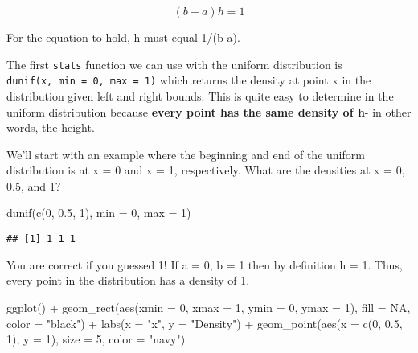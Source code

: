 \documentclass[
]{book}
\newenvironment{Shaded}{\begin{snugshade}}{\end{snugshade}}
\newcommand{\AttributeTok}[1]{\textcolor[rgb]{0.77,0.63,0.00}{#1}}
\newcommand{\ConstantTok}[1]{\textcolor[rgb]{0.00,0.00,0.00}{#1}}
\newcommand{\DecValTok}[1]{\textcolor[rgb]{0.00,0.00,0.81}{#1}}
\newcommand{\FloatTok}[1]{\textcolor[rgb]{0.00,0.00,0.81}{#1}}
\newcommand{\FunctionTok}[1]{\textcolor[rgb]{0.00,0.00,0.00}{#1}}
\newcommand{\NormalTok}[1]{#1}
\newcommand{\SpecialCharTok}[1]{\textcolor[rgb]{0.00,0.00,0.00}{#1}}
\newcommand{\StringTok}[1]{\textcolor[rgb]{0.31,0.60,0.02}{#1}}
\begin{document}
\[(b-a)h=1\]

For the equation to hold, h must equal 1/(b-a).

The first \texttt{stats} function we can use with the uniform distribution is \texttt{dunif(x,\ min\ =\ 0,\ max\ =\ 1)} which returns the density at point x in the distribution given left and right bounds. This is quite easy to determine in the uniform distribution because \textbf{every point has the same density of h}- in other words, the height.

We'll start with an example where the beginning and end of the uniform distribution is at x = 0 and x = 1, respectively. What are the densities at x = 0, 0.5, and 1?

\begin{Shaded}
\begin{Highlighting}[]
\FunctionTok{dunif}\NormalTok{(}\FunctionTok{c}\NormalTok{(}\DecValTok{0}\NormalTok{, }\FloatTok{0.5}\NormalTok{, }\DecValTok{1}\NormalTok{), }\AttributeTok{min =} \DecValTok{0}\NormalTok{, }\AttributeTok{max =} \DecValTok{1}\NormalTok{)}
\end{Highlighting}
\end{Shaded}

\begin{verbatim}
## [1] 1 1 1
\end{verbatim}

You are correct if you guessed 1! If a = 0, b = 1 then by definition h = 1. Thus, every point in the distribution has a density of 1.

\begin{Shaded}
\begin{Highlighting}[]
\FunctionTok{ggplot}\NormalTok{() }\SpecialCharTok{+}
  \FunctionTok{geom\_rect}\NormalTok{(}\FunctionTok{aes}\NormalTok{(}\AttributeTok{xmin =} \DecValTok{0}\NormalTok{, }\AttributeTok{xmax =} \DecValTok{1}\NormalTok{, }\AttributeTok{ymin =} \DecValTok{0}\NormalTok{, }\AttributeTok{ymax =} \DecValTok{1}\NormalTok{), }\AttributeTok{fill =} \ConstantTok{NA}\NormalTok{, }\AttributeTok{color =} \StringTok{"black"}\NormalTok{) }\SpecialCharTok{+}
  \FunctionTok{labs}\NormalTok{(}\AttributeTok{x =} \StringTok{"x"}\NormalTok{, }\AttributeTok{y =} \StringTok{"Density"}\NormalTok{) }\SpecialCharTok{+}
  \FunctionTok{geom\_point}\NormalTok{(}\FunctionTok{aes}\NormalTok{(}\AttributeTok{x =} \FunctionTok{c}\NormalTok{(}\DecValTok{0}\NormalTok{, }\FloatTok{0.5}\NormalTok{, }\DecValTok{1}\NormalTok{), }\AttributeTok{y =} \DecValTok{1}\NormalTok{), }\AttributeTok{size =} \DecValTok{5}\NormalTok{, }\AttributeTok{color =} \StringTok{"navy"}\NormalTok{)}
\end{Highlighting}
\end{Shaded}
\end{document}
